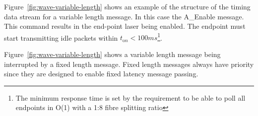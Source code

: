 \documentclass{dune}
\begin{document}
Figure~\ref{fig:wave-variable-length} shows an example of the structure of the timing data stream for a variable length message. In this case the A\_Enable message. This command results in the end-point laser being enabled. The endpoint must start transmitting idle packets within $t_{\mathrm on} < 100 ms$\footnote{The minimum response time is set by the requirement to be able to poll all endpoints in O(1) with a 1:8 fibre splitting ratio}. 

Figure~\ref{fig:wave-variable-length} shows a variable length message being interrupted by a fixed length message. Fixed length messages always have priority since they are designed to enable fixed latency message passing.
\end{document}
